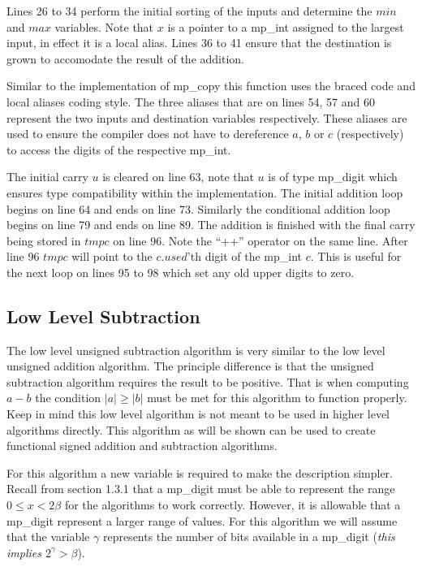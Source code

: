 \documentclass[b5paper]{book}
\begin{document}
Lines 26 to 34 perform the initial sorting of the inputs and determine the $min$ and $max$ variables.  Note that $x$ is a pointer to a 
mp\_int assigned to the largest input, in effect it is a local alias.  Lines 36 to 41 ensure that the destination is grown to 
accomodate the result of the addition. 

Similar to the implementation of mp\_copy this function uses the braced code and local aliases coding style.  The three aliases that are on 
lines 54, 57 and 60 represent the two inputs and destination variables respectively.  These aliases are used to ensure the
compiler does not have to dereference $a$, $b$ or $c$ (respectively) to access the digits of the respective mp\_int.

The initial carry $u$ is cleared on line 63, note that $u$ is of type mp\_digit which ensures type compatibility within the 
implementation.  The initial addition loop begins on line 64 and ends on line 73.  Similarly the conditional addition loop
begins on line 79 and ends on line 89.  The addition is finished with the final carry being stored in $tmpc$ on line 96.  
Note the ``++'' operator on the same line.  After line 96 $tmpc$ will point to the $c.used$'th digit of the mp\_int $c$.  This is useful
for the next loop on lines 95 to 98 which set any old upper digits to zero.

\subsection{Low Level Subtraction}
The low level unsigned subtraction algorithm is very similar to the low level unsigned addition algorithm.  The principle difference is that the
unsigned subtraction algorithm requires the result to be positive.  That is when computing $a - b$ the condition $\vert a \vert \ge \vert b\vert$ must 
be met for this algorithm to function properly.  Keep in mind this low level algorithm is not meant to be used in higher level algorithms directly.  
This algorithm as will be shown can be used to create functional signed addition and subtraction algorithms.


For this algorithm a new variable is required to make the description simpler.  Recall from section 1.3.1 that a mp\_digit must be able to represent
the range $0 \le x < 2\beta$ for the algorithms to work correctly.  However, it is allowable that a mp\_digit represent a larger range of values.  For 
this algorithm we will assume that the variable $\gamma$ represents the number of bits available in a 
mp\_digit (\textit{this implies $2^{\gamma} > \beta$}).  
\end{document}
